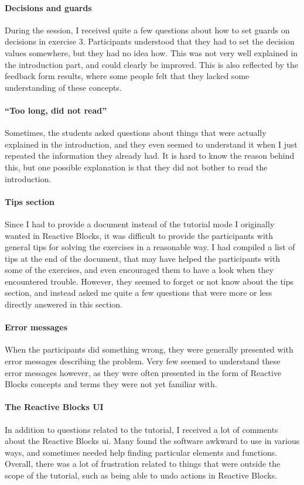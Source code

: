 \paragraph{Decisions and guards} During the session, I received quite a few questions about how to set guards on decisions in exercise 3. Participants understood that they had to set the decision values somewhere, but they had no idea how. This was not very well explained in the introduction part, and could clearly be improved. This is also reflected by the feedback form results, where some people felt that they lacked some understanding of these concepts.

\paragraph{``Too long, did not read''} Sometimes, the students asked questions about things that were actually explained in the introduction, and they even seemed to understand it when I just repeated the information they already had. It is hard to know the reason behind this, but one possible explanation is that they did not bother to read the introduction.

\paragraph{Tips section} Since I had to provide a document instead of the tutorial mode I originally wanted in Reactive Blocks, it was difficult to provide the participants with general tips for solving the exercises in a reasonable way. I had compiled a list of tips at the end of the document, that may have helped the participants with some of the exercises, and even encouraged them to have a look when they encountered trouble. However, they seemed to forget or not know about the tips section, and instead asked me quite a few questions that were more or less directly answered in this section.

\paragraph{Error messages} When the participants did something wrong, they were generally presented with error messages describing the problem. Very few seemed to understand these error messages however, as they were often presented in the form of Reactive Blocks concepts and terms they were not yet familiar with.

\paragraph{The Reactive Blocks UI} In addition to questions related to the tutorial, I received a lot of comments about the Reactive Blocks \gls{ui}. Many found the software awkward to use in various ways, and sometimes needed help finding particular elements and functions. Overall, there was a lot of frustration related to things that were outside the scope of the tutorial, such as being able to undo actions in Reactive Blocks.

